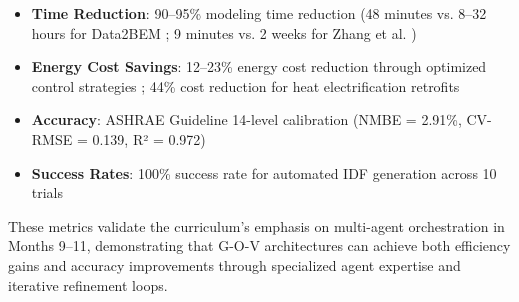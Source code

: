 \documentclass[12pt,a4paper]{article}
\begin{document}
\begin{itemize}
  \item \textbf{Time Reduction}: 90--95\% modeling time reduction (48 minutes vs. 8--32 hours for Data2BEM \cite{ref36}; 9 minutes vs. 2 weeks for Zhang et al. \cite{ref123})
  \item \textbf{Energy Cost Savings}: 12--23\% energy cost reduction through optimized control strategies \cite{ref47}; 44\% cost reduction for heat electrification retrofits \cite{ref36}
  \item \textbf{Accuracy}: ASHRAE Guideline 14-level calibration (NMBE = 2.91\%, CV-RMSE = 0.139, R² = 0.972) \cite{ref36}
  \item \textbf{Success Rates}: 100\% success rate for automated IDF generation across 10 trials \cite{ref123}
\end{itemize}
These metrics validate the curriculum's emphasis on multi-agent orchestration in Months 9--11, demonstrating that G-O-V architectures can achieve both efficiency gains and accuracy improvements through specialized agent expertise and iterative refinement loops.
\end{document}
